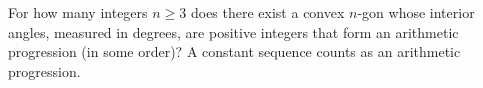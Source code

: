 For how many integers $n\ge3$ does there exist a convex $n$-gon whose interior angles, measured in degrees, are positive integers that form an arithmetic progression (in some order)? A constant sequence counts as an arithmetic progression.
